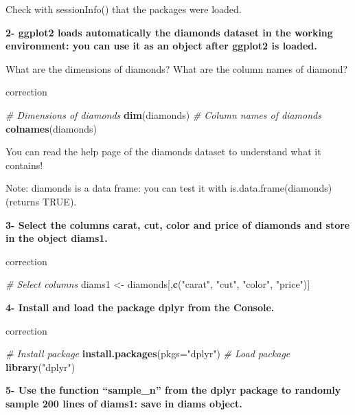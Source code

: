 \documentclass[]{book}
\newenvironment{Shaded}{\begin{snugshade}}{\end{snugshade}}
\newcommand{\CommentTok}[1]{\textcolor[rgb]{0.56,0.35,0.01}{\textit{#1}}}
\newcommand{\DataTypeTok}[1]{\textcolor[rgb]{0.13,0.29,0.53}{#1}}
\newcommand{\KeywordTok}[1]{\textcolor[rgb]{0.13,0.29,0.53}{\textbf{#1}}}
\newcommand{\NormalTok}[1]{#1}
\newcommand{\StringTok}[1]{\textcolor[rgb]{0.31,0.60,0.02}{#1}}
\begin{document}
Check with sessionInfo() that the packages were loaded.

\textbf{2- ggplot2 loads automatically the diamonds dataset in the working environment: you can use it as an object after ggplot2 is loaded.}

What are the dimensions of diamonds? What are the column names of diamond?

correction

\begin{Shaded}
\begin{Highlighting}[]
\CommentTok{# Dimensions of diamonds}
\KeywordTok{dim}\NormalTok{(diamonds)}
\CommentTok{# Column names of diamonds}
\KeywordTok{colnames}\NormalTok{(diamonds)}
\end{Highlighting}
\end{Shaded}

You can read the help page of the diamonds dataset to understand what it contains!

Note: diamonds is a data frame: you can test it with is.data.frame(diamonds) (returns TRUE).

\textbf{3- Select the columns carat, cut, color and price of diamonds and store in the object diams1.}

correction

\begin{Shaded}
\begin{Highlighting}[]
\CommentTok{# Select columns}
\NormalTok{diams1 <-}\StringTok{ }\NormalTok{diamonds[,}\KeywordTok{c}\NormalTok{(}\StringTok{"carat"}\NormalTok{, }\StringTok{"cut"}\NormalTok{, }\StringTok{"color"}\NormalTok{, }\StringTok{"price"}\NormalTok{)]}
\end{Highlighting}
\end{Shaded}

\textbf{4- Install and load the package dplyr from the Console.}

correction

\begin{Shaded}
\begin{Highlighting}[]
\CommentTok{# Install package}
\KeywordTok{install.packages}\NormalTok{(}\DataTypeTok{pkgs=}\StringTok{"dplyr"}\NormalTok{)}
\CommentTok{# Load package}
\KeywordTok{library}\NormalTok{(}\StringTok{"dplyr"}\NormalTok{)}
\end{Highlighting}
\end{Shaded}

\textbf{5- Use the function ``sample\_n'' from the dplyr package to randomly sample 200 lines of diams1: save in diams object.}
\end{document}
